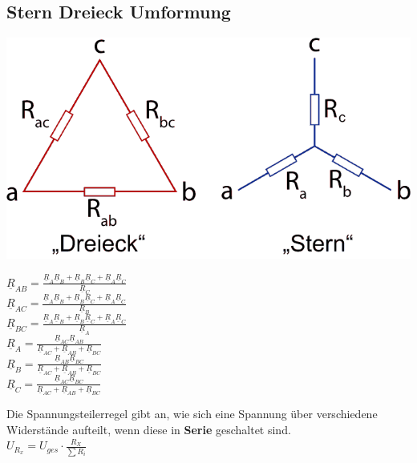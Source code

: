 										\subsection{Stern Dreieck Umformung}
										\begin{center}
		\includegraphics[scale=0.3]{img/Stern-Dreieck-Transformation.png}
\end{center}
	\begin{multicols*}{2}
		$\underline{R}_{AB}=\frac{\underline{R}_{A}\underline{R}_{B}+\underline{R}_{B}\underline{R}_{C}+\underline{R}_{A}\underline{R}_{C}}{\underline{R}_{C}}$\\
		$\underline{R}_{AC}=\frac{\underline{R}_{A}\underline{R}_{B}+\underline{R}_{B}\underline{R}_{C}+\underline{R}_{A}\underline{R}_{C}}{\underline{R}_{B}}$\\
		$\underline{R}_{BC}=\frac{\underline{R}_{A}\underline{R}_{B}+\underline{R}_{B}\underline{R}_{C}+\underline{R}_{A}\underline{R}_{C}}{\underline{R}_{A}}$\\
		$\underline{R}_A=\frac{\underline{R}_{AC}\underline{R}_{AB}}{\underline{R}_{AC}+\underline{R}_{AB}+\underline{R}_{BC}}$\\
		$\underline{R}_B=\frac{\underline{R}_{AB}\underline{R}_{BC}}{\underline{R}_{AC}+\underline{R}_{AB}+\underline{R}_{BC}}$\\
		$\underline{R}_C=\frac{\underline{R}_{AC}\underline{R}_{BC}}{\underline{R}_{AC}+\underline{R}_{AB}+\underline{R}_{BC}}$
	\end{multicols*}




										\beginip
										Die Spannungsteilerregel gibt an, wie sich eine Spannung über verschiedene Widerstände aufteilt, wenn diese in \textbf{Serie} geschaltet sind. \\
											\formulaBegin
											$\displaystyle U_{R_x} = U_{ges} \cdot \frac{R_X}{\sum R_i} $
											\formulaEnd

